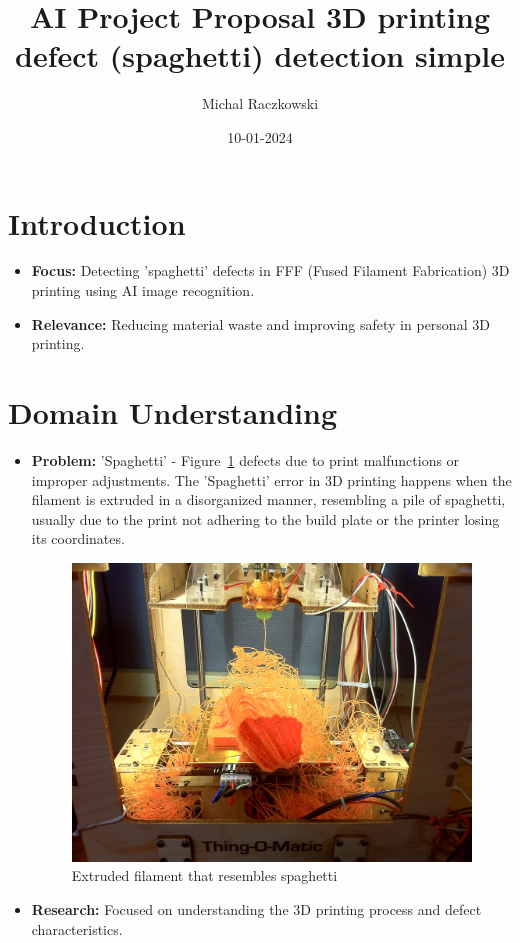 \documentclass[12pt,a4paper]{article}
\title{\textbf{AI Project Proposal 3D printing defect (spaghetti) detection simple}}
\author{Michal Raczkowski}
\date{10-01-2024}
\begin{document}
\maketitle
\thispagestyle{empty} %

\newpage
\tableofcontents
\newpage

\setcounter{page}{1} %

\section{Introduction}
\begin{itemize}
    \item \textbf{Focus:} Detecting 'spaghetti' defects in FFF (Fused Filament Fabrication) 3D printing using AI image recognition.
    \item \textbf{Relevance:} Reducing material waste and improving safety in personal 3D printing.
\end{itemize}

\section{Domain Understanding}
\begin{itemize}
    \item \textbf{Problem:} 'Spaghetti' - Figure~\ref{fig:spaghetti3D} defects due to print malfunctions or improper adjustments.
    The 'Spaghetti' error in 3D printing happens when the filament is extruded in a disorganized manner, resembling a pile of spaghetti, usually due to the print not adhering to the build plate or the printer losing its coordinates.
    \begin{figure}[h]
    \centering
    \includegraphics[width=0.5\linewidth]{spaghetti3D.jpg}
    \caption{Extruded filament that resembles spaghetti}
    \label{fig:spaghetti3D}
    \end{figure}

    \item \textbf{Research:} Focused on understanding the 3D printing process and defect characteristics.
\end{itemize}
\end{document}
